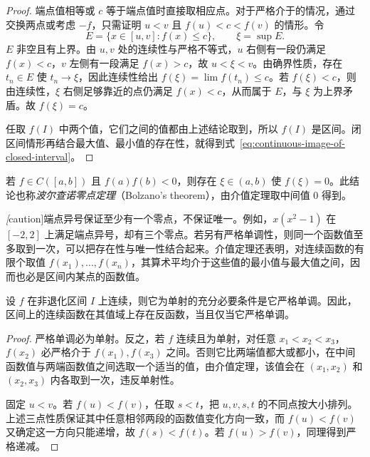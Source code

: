\begin{proof}
端点值相等或 $c$ 等于端点值时直接取相应点。对于严格介于的情况，通过交换两点或考虑 $-f$，只需证明 $u<v$ 且 $f(u)<c<f(v)$ 的情形。令
\[
    E=\{x\in[u,v]:f(x)\leq c\},\qquad \xi=\sup E.
\]
$E$ 非空且有上界。由 $u,v$ 处的连续性与严格不等式，$u$ 右侧有一段仍满足 $f(x)<c$，$v$ 左侧有一段满足 $f(x)>c$，故 $u<\xi<v$。由确界性质，存在 $t_n\in E$ 使 $t_n\to\xi$，因此连续性给出 $f(\xi)=\lim f(t_n)\leq c$。若 $f(\xi)<c$，则由连续性，$\xi$ 右侧足够靠近的点仍满足 $f(x)<c$，从而属于 $E$，与 $\xi$ 为上界矛盾。故 $f(\xi)=c$。

任取 $f(I)$ 中两个值，它们之间的值都由上述结论取到，所以 $f(I)$ 是区间。闭区间情形再结合最大值、最小值的存在性，就得到式~\eqref{eq:continuous-image-of-closed-interval}。
\end{proof}

\begin{corollary}[零点存在定理]
\label{cor:bolzano-zero-existence}
若 $f\in C([a,b])$ 且 $f(a)f(b)<0$，则存在 $\xi\in(a,b)$ 使 $f(\xi)=0$。此结论也称\emph{波尔查诺零点定理}（Bolzano's theorem），由介值定理取中间值 $0$ 得到。
\end{corollary}

\emph[caution]{端点异号保证至少有一个零点，不保证唯一。}例如，$x(x^2-1)$ 在 $[-2,2]$ 上满足端点异号，却有三个零点。若另有严格单调性，则同一个函数值至多取到一次，可以把存在性与唯一性结合起来。介值定理还表明，对连续函数的有限个取值 $f(x_1),\ldots,f(x_n)$，其算术平均介于这些值的最小值与最大值之间，因而也必是区间内某点的函数值。

\begin{proposition}[连续函数的单射性与严格单调性]
\label{prop:continuous-injective-function-strict-monotonicity}
设 $f$ 在非退化区间 $I$ 上连续，则它为单射的充分必要条件是它严格单调。因此，区间上的连续函数在其值域上存在反函数，当且仅当它严格单调。
\end{proposition}

\begin{proof}
严格单调必为单射。反之，若 $f$ 连续且为单射，对任意 $x_1<x_2<x_3$，$f(x_2)$ 必严格介于 $f(x_1),f(x_3)$ 之间。否则它比两端值都大或都小，在中间函数值与两端函数值之间选取一个适当的值，由介值定理，该值会在 $(x_1,x_2)$ 和 $(x_2,x_3)$ 内各取到一次，违反单射性。

固定 $u<v$。若 $f(u)<f(v)$，任取 $s<t$，把 $u,v,s,t$ 的不同点按大小排列。上述三点性质保证其中任意相邻两段的函数值变化方向一致，而 $f(u)<f(v)$ 又确定这一方向只能递增，故 $f(s)<f(t)$。若 $f(u)>f(v)$，同理得到严格递减。
\end{proof}

